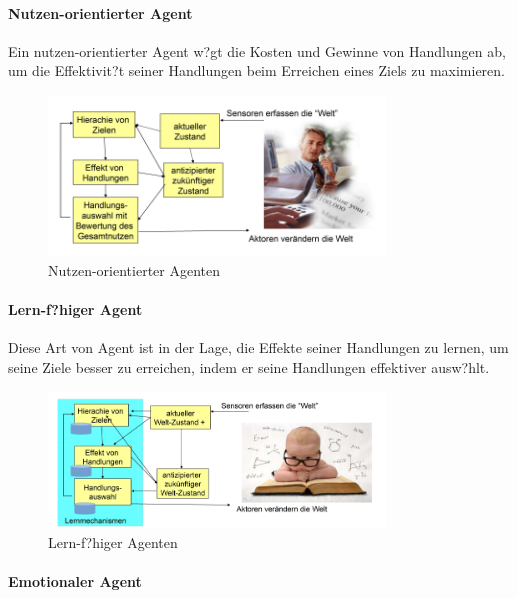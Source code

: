 \newpage
\paragraph{Nutzen-orientierter Agent}

Ein nutzen-orientierter Agent w?gt die Kosten und Gewinne von Handlungen ab, um die Effektivit?t seiner Handlungen beim Erreichen eines Ziels zu maximieren.

\begin{figure}[H]
    \centering
    \includegraphics[width=0.8\textwidth]{figures/nutzen-orientierter-agent.png}
    \caption{Nutzen-orientierter Agenten}
    \label{fig:nutzen-orientierter-agent}
\end{figure}

\paragraph{Lern-f?higer Agent}

Diese Art von Agent ist in der Lage, die Effekte seiner Handlungen zu lernen, um seine Ziele besser zu erreichen, indem er seine Handlungen effektiver ausw?hlt.

\begin{figure}[H]
    \centering
    \includegraphics[width=0.8\textwidth]{figures/lern-agent.png}
    \caption{Lern-f?higer Agenten}
    \label{fig:lernen-agent}
\end{figure}

\paragraph{Emotionaler Agent}

